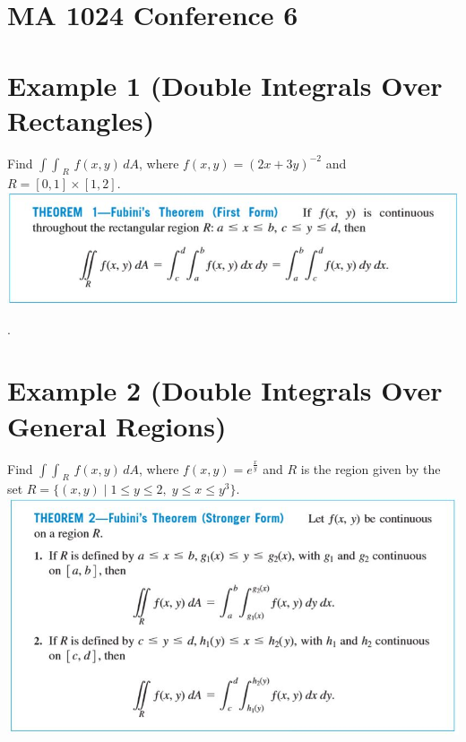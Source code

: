 \documentclass[11pt]{article}
\begin{document}
\section*{MA 1024 Conference 6}



\section*{Example 1 (Double Integrals Over Rectangles)}

Find $\int \int_{\; R} \, f(x,y) \, dA$, where $f(x,y) = (2x+3y)^{-2}$ and $R = [0,1] \times [1,2]$. \\

\includegraphics{Capture1.jpg}



\newpage

.

\newpage

\section*{Example 2 (Double Integrals Over General Regions)}

Find $\int \int_{\; R} \, f(x,y) \, dA$, where $f(x,y) = e^{\frac{x}{y}}$ and $R$ is the region given by the set $R = \{(x,y) \; | \; 1\leq y \leq 2, \; y\leq x \leq y^3\}$. \\

\includegraphics{Capture2.jpg}
\end{document}
